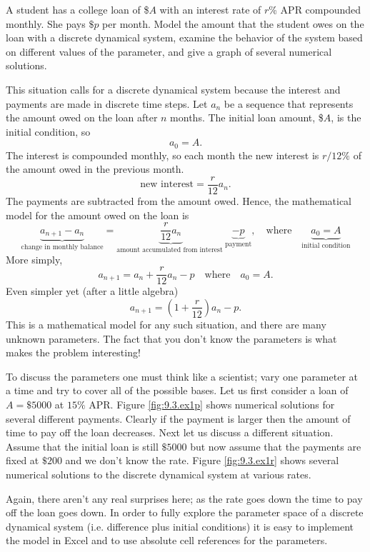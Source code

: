\begin{example}
A student has a college loan of \$$A$ with an interest rate of $r$\% APR compounded monthly.  She pays
$\$p$ per month.  Model the amount that the student owes on the loan with a discrete
dynamical system, examine the behavior of the system based on different values of the
parameter, and give a graph of several numerical solutions.

This situation calls for a discrete dynamical system because the interest and payments are
made in discrete time steps.  Let $a_n$ be a sequence that represents the amount owed on
the loan after $n$ months.  The initial loan amount, \$$A$, is the initial condition, so
\[ a_0 = A. \]
The interest is compounded monthly, so each month the new interest is $r/12\%$ of the
amount owed in the previous month.
\[ \text{new interest} = \frac{r}{12} a_n. \]
The payments are subtracted from the amount owed.  Hence, the mathematical model for the
amount owed on the loan is
\[ \underbrace{a_{n+1}-a_n}_{\text{change in monthly balance}}  = \underbrace{\frac{r}{12}
a_n}_{\text{amount accumulated from interest }} \underbrace{- p}_{\text{payment}}, \quad
\text{where} \quad \underbrace{a_0 = A}_{\text{initial condition}} \]
More simply,
\[ a_{n+1} = a_n + \frac{r}{12} a_n - p \quad \text{where} \quad a_0 = A. \]
Even simpler yet (after a little algebra)
\[ a_{n+1} = \left( 1 + \frac{r}{12} \right) a_n - p. \]
This is a mathematical model for any such situation, and there are many unknown
parameters.  The fact that you don't know the parameters is what makes the problem
interesting!

To discuss the parameters one must think like a scientist; vary one parameter at a time
and try to cover all of the possible bases.  Let us first consider a loan of $A=\$5000$ at
$15\%$ APR.  Figure \ref{fig:9.3.ex1p} shows numerical solutions for several different
payments. Clearly if the payment is larger then the amount of time to pay off the loan
decreases.  
Next let us discuss a different situation.  Assume that the initial loan is still $\$5000$
but now assume that the payments are fixed at $\$200$ and we don't know the rate.  Figure
\ref{fig:9.3.ex1r} shows several numerical solutions to the discrete dynamical system at various rates.

Again, there aren't any real surprises here; as the rate goes down the time to pay off the
loan goes down.  In order to fully explore the parameter space of a discrete dynamical
system (i.e. difference plus initial conditions)  it is easy to
implement the model in Excel and to use absolute cell references for the parameters.  
\end{example}
